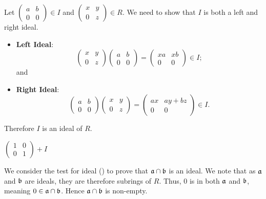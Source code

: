 \begin{questions}
\begin{partquestions}{\roman*}
        \item Let $\begin{pmatrix}a&b\\0&0\end{pmatrix} \in I$ and $\begin{pmatrix}x&y\\0&z\end{pmatrix} \in R$. We need to show that $I$ is both a left and right ideal.
        \begin{itemize}
            \item \textbf{Left Ideal}:
            \[
                \begin{pmatrix}x&y\\0&z\end{pmatrix}\begin{pmatrix}a&b\\0&0\end{pmatrix} = \begin{pmatrix}xa&xb\\0&0\end{pmatrix} \in I;
            \]
            and
            \item \textbf{Right Ideal}: \[
                \begin{pmatrix}a&b\\0&0\end{pmatrix}\begin{pmatrix}x&y\\0&z\end{pmatrix} = \begin{pmatrix}ax&ay+bz\\0&0\end{pmatrix} \in I.
            \]
        \end{itemize}
        Therefore $I$ is an ideal of $R$.

        \item $\begin{pmatrix}1&0\\0&1\end{pmatrix} + I$
    \end{partquestions}

    \item We consider the test for ideal () to prove that $\mathfrak{a}\cap\mathfrak{b}$ is an ideal. We note that as $\mathfrak{a}$ and $\mathfrak{b}$ are ideals, they are therefore subrings of $R$. Thus, 0 is in both $\mathfrak{a}$ and $\mathfrak{b}$, meaning $0 \in \mathfrak{a}\cap\mathfrak{b}$. Hence $\mathfrak{a}\cap\mathfrak{b}$ is non-empty.
    

\end{questions}
